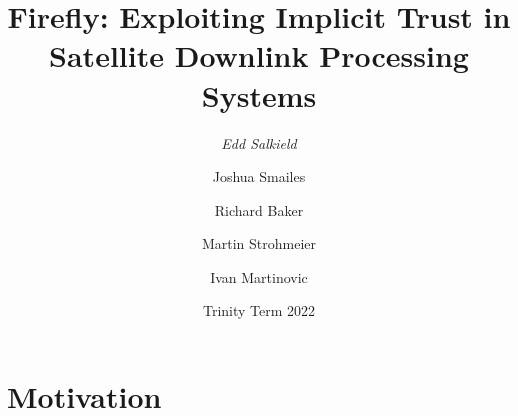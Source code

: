 \documentclass{beamer}
\begin{document}

\title{Firefly: Exploiting Implicit Trust in Satellite Downlink Processing Systems}
\author[Edd Salkield]{
  \emph{Edd Salkield}
  \and
  Joshua Smailes
  \and
  Richard Baker
  \and
  Martin Strohmeier
  \and
  Ivan Martinovic
}
\date{Trinity Term 2022}

\begin{frame}
  \titlepage
\end{frame}

\section{Motivation}
\end{document}
